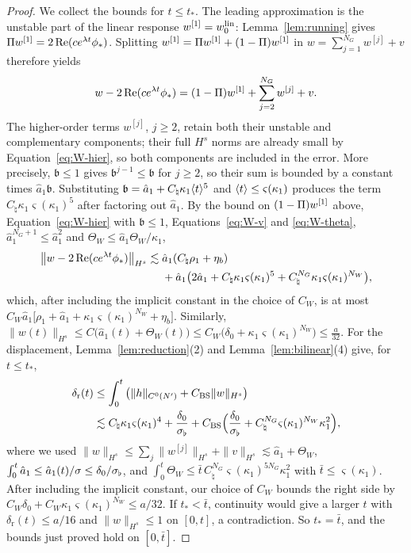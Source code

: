 \begin{proof}
We collect the bounds for $t\le t_*$. The leading approximation is the
unstable part of the linear response $w^{[1]}=w^{\mathrm{lin}}_0$:
Lemma~\ref{lem:running} gives $\Pi w^{[1]}=2\Re(ce^{\lambda t}\phi_*)$.
Splitting $w^{[1]}=\Pi w^{[1]}+(1-\Pi)w^{[1]}$ in
$w=\sum_{j=1}^{N_G}w^{[j]}+v$ therefore yields
\[
w-2\Re(ce^{\lambda t}\phi_*)
=(1-\Pi)w^{[1]}+\sum_{j=2}^{N_G}w^{[j]}+v.
\]
The higher-order terms $w^{[j]}$, $j\ge2$, retain both their unstable and
complementary components; their full $H^s$ norms are already small by
Equation~\eqref{eq:W-hier}, so both components are included in the error.
More precisely, $\mathfrak b\le1$ gives $\mathfrak b^{j-1}\le\mathfrak b$ for
$j\ge2$, so their sum is bounded by a constant times $\hat a_1\mathfrak b$.
Substituting $\mathfrak b=\hat a_1+C_\natural\kappa_1\langle t\rangle^5$ and
$\langle t\rangle\le\varsigma(\kappa_1)$ produces the term
$C_\natural\kappa_1\varsigma(\kappa_1)^5$ after factoring out $\hat a_1$.
By the bound on
$(1-\Pi)w^{[1]}$ above, Equation~\eqref{eq:W-hier} with $\mathfrak b\le1$,
Equations~\eqref{eq:W-v} and \eqref{eq:W-theta}, $\hat a_1^{N_G+1}\le\hat a_1^2$ and $\Theta_W\le\hat a_1\Theta_W/\kappa_1$,
\[
\begin{aligned}
\big\|w-2\Re(ce^{\lambda t}\phi_*)\big\|_{H^s}\lesssim{}&\hat a_1(C_\natural\rho_1+\eta_b)\\
&+\hat a_1\big(2\hat a_1+C_\natural\kappa_1\varsigma(\kappa_1)^{5}+C_\natural^{N_G}\kappa_1\varsigma(\kappa_1)^{N_W}\big),
\end{aligned}
\]
which, after including the implicit constant in the choice of $C_W$, is at most
$C_W\hat a_1\big[\rho_1+\hat a_1+\kappa_1\varsigma(\kappa_1)^{N_W}+\eta_b\big]$.
Similarly,
$\|w(t)\|_{H^s}\le C\big(\hat a_1(t)+\Theta_W(t)\big)\le C_W\big(\delta_0+\kappa_1\varsigma(\kappa_1)^{N_W}\big)\le\tfrac a{32}$.
For the displacement, Lemma~\ref{lem:reduction}\textup{(2)} and
Lemma~\ref{lem:bilinear}\textup{(4)} give, for $t\le t_*$,
\[
\begin{aligned}
\delta_{\mathrm r}(t)&\le\int_0^t\big(\|h\|_{C^0(N')}+C_{\mathrm{BS}}\|w\|_{H^s}\big)\\
&\lesssim C_\natural\kappa_1\varsigma(\kappa_1)^{4}+\frac{\delta_0}{\sigma_\flat}+C_{\mathrm{BS}}\Big(\frac{\delta_0}{\sigma_\flat}+C_\natural^{N_G}\varsigma(\kappa_1)^{N_W}\kappa_1^2\Big),
\end{aligned}
\]
where we used $\|w\|_{H^s}\le\sum_j\|w^{[j]}\|_{H^s}+\|v\|_{H^s}\lesssim\hat a_1+\Theta_W$,
$\int_0^t\hat a_1\le\hat a_1(t)/\sigma\le\delta_0/\sigma_\flat$, and
$\int_0^t\Theta_W\le\bar t\,C_\natural^{N_G}\varsigma(\kappa_1)^{5N_G}\kappa_1^2$ with
$\bar t\le\varsigma(\kappa_1)$. After including the implicit constant, our choice
of $C_W$ bounds the right side by
$C_W\delta_0+C_W\kappa_1\varsigma(\kappa_1)^{N_W}\le a/32$. If $t_*<\bar t$, continuity
would give a larger $t$ with $\delta_{\mathrm r}(t)\le a/16$ and $\|w\|_{H^s}\le1$ on $[0,t]$, a
contradiction. So $t_*=\bar t$, and the bounds just proved hold on $[0,\bar t]$.
\end{proof}

